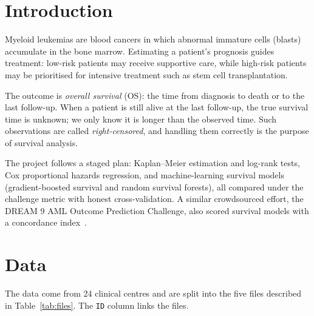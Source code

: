 \documentclass[11pt,a4paper]{article}
\begin{document}
\begin{abstract}
shared by both centres, is the strongest signal. Against the published IPSS-M score,
computed with no fitting (cross-validated 0.720), no fitted model is statistically better
in cross-validation (ensemble $+0.005$, 95\% CI $-0.005$ to $+0.014$), and the recalibrated
IPSS-M is slightly better calibrated. On the unseen test centre, however, the IPSS-M scored
only 0.7255, 0.030 below the ensemble. Neither the test centre's sicker case mix nor its
missing blood counts explains this gap; it lies above the range seen across training
centres ($-0.014$ to $+0.019$), but it rests on one centre and has no confidence interval.
Domain knowledge, whether built into the features or into the IPSS-M, accounts for nearly
all of the predictive performance.
\end{abstract}

\section{Introduction}
Myeloid leukemias are blood cancers in which abnormal immature cells (blasts)
accumulate in the bone marrow. Estimating a patient's prognosis guides treatment:
low-risk patients may receive supportive care, while high-risk patients may be
prioritised for intensive treatment such as stem cell transplantation.

The outcome is \emph{overall survival} (OS): the time from diagnosis to death or to the
last follow-up. When a patient is still alive at the last follow-up, the true survival
time is unknown; we only know it is longer than the observed time. Such observations
are called \emph{right-censored}, and handling them correctly is the purpose of
survival analysis.

The project follows a staged plan:
Kaplan--Meier estimation and log-rank tests,
Cox proportional hazards regression,
and machine-learning survival models (gradient-boosted survival and random survival
forests), all compared under the challenge metric with honest cross-validation.
A similar crowdsourced effort, the DREAM 9 AML Outcome Prediction Challenge, also
scored survival models with a concordance index~\cite{noren2016}.

\section{Data}
The data come from 24 clinical centres and are split into the five files described in
Table~\ref{tab:files}. The \texttt{ID} column links the files.
\end{document}
